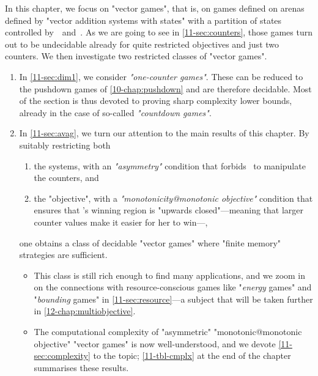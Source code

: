In this chapter, we focus on "vector games", that is, on games defined
on arenas defined by "vector addition systems with states" with a
partition of states controlled by~\Eve\ and~\Adam.  As we are going to
see in \cref{11-sec:counters}, those games turn out to be undecidable
already for quite restricted objectives and just two counters.  We
then investigate two restricted classes of "vector games".
\begin{enumerate}
\item In \cref{11-sec:dim1}, we consider \emph{"one-counter games"}.  These can
  be reduced to the pushdown games of \cref{10-chap:pushdown} and are
  therefore decidable.  Most of the section is thus devoted to proving
  sharp complexity lower bounds, already in the case of so-called
  \emph{"countdown games"}.
\item In \cref{11-sec:avag}, we turn our attention to the main results of
  this chapter.  By suitably restricting both
  \begin{enumerate}
  \item   the systems, with an
  \emph{"asymmetry"} condition that forbids \Adam\ to manipulate the
  counters, and
  \item   the "objective", with a \emph{"monotonicity@monotonic objective"}
    condition that ensures that \Eve's winning region is "upwards
    closed"---meaning that larger counter values make it easier for
    her to win---,
  \end{enumerate}
  one obtains a class of decidable "vector games" where "finite
  memory" strategies are sufficient.
  \begin{itemize}
  \item   This class is still rich enough to find many applications, and we
  zoom in on the connections with resource-conscious games like
  "\emph{energy} games" and "\emph{bounding} games" in
  \cref{11-sec:resource}---a subject that will be taken further in
  \cref{12-chap:multiobjective}.
  
  \item The computational complexity of "asymmetric" "monotonic@monotonic
  objective" "vector games" is now well-understood, and we devote
  \cref{11-sec:complexity} to the topic; \cref{11-tbl-cmplx} at the end of
  the chapter summarises these results.
  \end{itemize}
\end{enumerate}


\ifstandalone
{}
\tableofcontents
\fi

